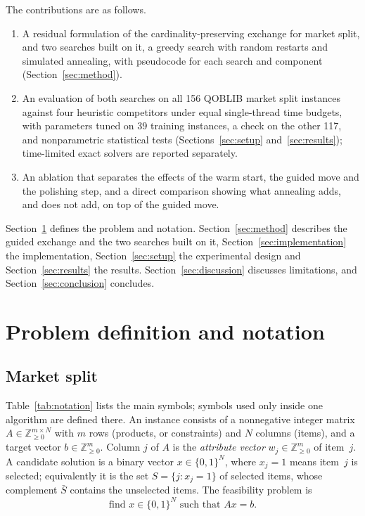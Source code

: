 \documentclass[pdflatex,sn-mathphys-num]{sn-jnl}
\theoremstyle{thmstyleone}
\theoremstyle{thmstylethree}
\newcommand{\Z}{\mathbb{Z}}
\newcommand{\B}{\{0,1\}}
\begin{document}
The contributions are as follows.
\begin{enumerate}
  \item A residual formulation of the cardinality-preserving exchange for market split, and two searches built on it, a greedy search with random restarts and simulated annealing, with pseudocode for each search and component (Section~\ref{sec:method}).
  \item An evaluation of both searches on all 156 QOBLIB market split instances against four heuristic competitors under equal single-thread time budgets, with parameters tuned on 39 training instances, a check on the other 117, and nonparametric statistical tests (Sections~\ref{sec:setup} and~\ref{sec:results}); time-limited exact solvers are reported separately.
  \item An ablation that separates the effects of the warm start, the guided move and the polishing step, and a direct comparison showing what annealing adds, and does not add, on top of the guided move.
\end{enumerate}

Section~\ref{sec:problem} defines the problem and notation. Section~\ref{sec:method} describes the guided exchange and the two searches built on it, Section~\ref{sec:implementation} the implementation, Section~\ref{sec:setup} the experimental design and Section~\ref{sec:results} the results. Section~\ref{sec:discussion} discusses limitations, and Section~\ref{sec:conclusion} concludes.

\section{Problem definition and notation}\label{sec:problem}

\subsection{Market split}
Table~\ref{tab:notation} lists the main symbols; symbols used only inside one algorithm are defined there. An instance consists of a nonnegative integer matrix $A\in\Z_{\ge0}^{m\times N}$ with $m$ rows (products, or constraints) and $N$ columns (items), and a target vector $b\in\Z_{\ge0}^{m}$. Column $j$ of $A$ is the \emph{attribute vector} $w_j\in\Z_{\ge0}^{m}$ of item~$j$. A candidate solution is a binary vector $x\in\B^N$, where $x_j=1$ means item~$j$ is selected; equivalently it is the set $S=\{j:x_j=1\}$ of selected items, whose complement $\bar S$ contains the unselected items. The feasibility problem is
\begin{equation}
  \text{find } x\in\B^N \text{ such that } Ax=b. \label{eq:msp}
\end{equation}
\end{document}
